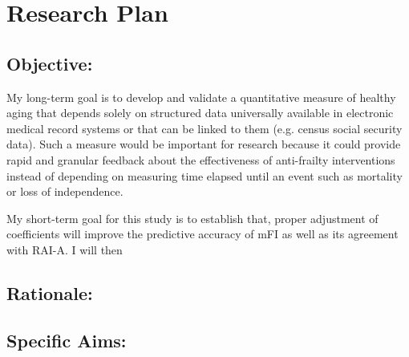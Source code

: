 \section{Research Plan }\label{research-plan}


\subsection{Objective:}\label{objective}
  
My long-term goal is to develop and validate a quantitative measure of healthy aging that depends solely on structured data universally available in electronic medical record systems or that can be linked to them (e.g. census social security data). Such a measure would be important for research because it could provide rapid and granular feedback about the effectiveness of anti-frailty interventions instead of depending on measuring time elapsed until an event such as mortality or loss of independence.

My short-term goal for this study is to establish that, proper adjustment of coefficients will improve the predictive accuracy of mFI as well as its agreement with RAI-A. I will then 

\subsection{Rationale:}\label{rationale}

\subsection{Specific Aims:}\label{specific-aims}

